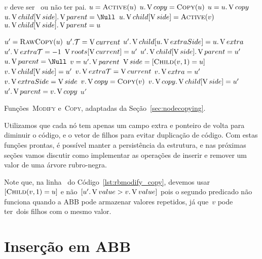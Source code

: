 \documentclass[main.tex]{subfiles}
\begin{document}
\begin{algorithm}
\begin{algorithmic}[1]

\Require $v$ deve ser~ ou não ter pai.
 
	\State $u = \Call{Active}{u}$
		\State $u.\cp = \Call{Copy}{u}$
		\State $u = u.\operatorname{V}{copy}$
	\EndIf
		\State $u.\child[\side].\parent = \Null$
	\EndIf
	\State $u.\child[\side] = \Call{Active}{v}$
		\State $u.\operatorname{V}{child}[\operatorname{V}{side}].\operatorname{V}{parent} = u$
	\EndIf
\EndFunction

	\State $u' = \Call{RawCopy}{u}$
	\State $u'.\mathcal{T} = \operatorname{V}{current}$
		\State $u'.\operatorname{V}{child}[u.\operatorname{V}{extraSide}] = u.\operatorname{V}{extra}$
		\State $u'.\operatorname{V}{extra\mathcal{T}} = -1$ 
	\EndIf
		\State $\operatorname{V}{roots}[\operatorname{V}{current}] = u'$
	\EndIf
			\State $u'.\operatorname{V}{child}[\operatorname{V}{side}].\operatorname{V}{parent} = u'$
		\EndIf
	\EndFor
	\State $u.\parent = \Null$
		\State $v = u'.\operatorname{V}{parent}$
		\State $\side = [\Call{Child}{v, 1} = u]$ \label{line:copyrb:side}
			\State $v.\operatorname{V}{child}[\operatorname{V}{side}] = u'$
			\State $v.\operatorname{V}{extra\mathcal{T}} = \operatorname{V}{current}$
			\State $v.\operatorname{V}{extra} = u'$
			\State $v.\operatorname{V}{extraSide} = \operatorname{V}{side}$
		\Else
			\State $v.\cp = \Call{Copy}{v}$
			\State $v.\operatorname{V}{copy}.\operatorname{V}{child}[\operatorname{V}{side}] = u'$
			\State $u'.\operatorname{V}{parent} = v.\operatorname{V}{copy}$
		\EndIf
	\EndIf
	\State \Return $u'$
\EndFunction

\end{algorithmic}
\caption{Funções~\textsc{Modify} e~\textsc{Copy}, adaptadas da Seção~\ref{sec:nodecopying}.} \label{lst:rbmodify_copy}
\end{algorithm}

Utilizamos que cada nó tem apenas um campo extra e ponteiro de volta para diminuir o código, e o vetor de filhos para evitar duplicação de código. Com estas funções prontas, é possível manter a persistência da estrutura, e nas próximas seções vamos discutir como implementar as operações de inserir e remover um valor de uma árvore rubro-negra.

Note que, na linha~ do Código~\ref{lst:rbmodify_copy}, devemos usar~$[\Call{Child}{v, 1} = u]$ e não~$[u'.\operatorname{V}{value} > v.\operatorname{V}{value}]$ pois o segundo predicado não funciona quando a ABB pode armazenar valores repetidos, já que~$v$ pode ter~dois filhos com o mesmo valor.

\section{Inserção em ABB}
\end{document}
